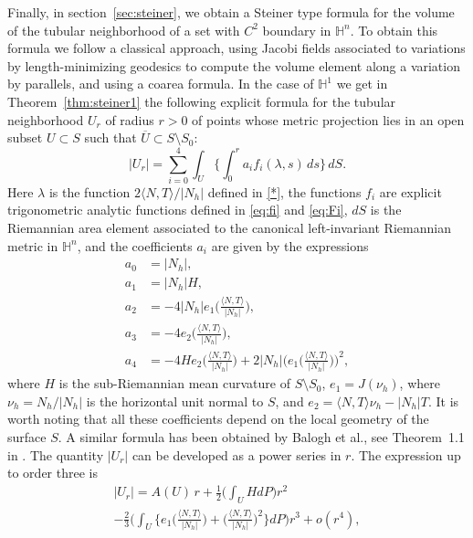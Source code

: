 \documentclass[10pt]{amsart}
\theoremstyle{definition}
\theoremstyle{remark}
\numberwithin{equation}{section}
\begin{document}
Finally, in section~\ref{sec:steiner}, we obtain a Steiner type formula for the volume of the tubular neighborhood of a set with $C^2$ boundary in ${{\mathbb{H}}}^n$. To obtain this formula we follow a classical approach, using Jacobi fields associated to variations by length-minimizing geodesics to compute the volume element along a variation by parallels, and using a coarea formula. In the case of ${{\mathbb{H}}}^1$ we get in  Theorem~\ref{thm:steiner1} the following explicit formula for the tubular neighborhood $U_r$ of radius $r>0$ of points whose metric projection lies in an open subset $U\subset S$ such that $\overline{U}\subset S\setminus S_0$:
\begin{equation*}
|U_r|= \sum_{i=0}^4\int_U\bigg\{\int_0^r a_i f_i({\lambda}, s)\,ds\bigg\}\,dS.
\end{equation*}
Here ${\lambda}$ is the function $2{\langle{N,T}\rangle}/|N_h|$ defined in \eqref{*}, the functions $f_i$ are explicit trigonometric analytic functions defined in \eqref{eq:fi} and \eqref{eq:Fi}, $dS$ is the Riemannian area element associated to the canonical left-invariant Riemannian metric in ${{\mathbb{H}}}^n$, and the coefficients $a_i$ are given by the expressions
\begin{equation*}
\begin{split}
a_{0}&=|N_{h}|,
\\
a_{1}&=|N_h| H,
\\
a_{2}&=-4|N_h|e_1\bigg({\frac{{\langle{N,T}\rangle}}{|N_h|}}\bigg),
\\
a_{3}&=-4e_2\bigg({\frac{{\langle{N,T}\rangle}}{|N_h|}}\bigg),
\\
a_{4}&=-4He_2\bigg({\frac{{\langle{N,T}\rangle}}{|N_h|}}\bigg)+2|N_h|\bigg(e_1\bigg({\frac{{\langle{N,T}\rangle}}{|N_h|}}\bigg)\bigg)^2,
\end{split}
\end{equation*}
where $H$ is the sub-Riemannian mean curvature of $S\setminus S_0$, $e_1=J({\nu_{h}})$, where ${\nu_{h}}=N_h/|N_h|$ is the horizontal unit normal to $S$, and $e_2={\langle{N,T}\rangle}{\nu_{h}}-{|N_{h}|} T$. It is worth noting that all these coefficients depend on the local geometry of the surface $S$. A similar formula has been obtained by Balogh et al., see Theorem~1.1 in \cite{MR3388879}. The quantity $|U_r|$ can be developed as a power series in $r$. The expression up to order three is
\begin{multline*}
|U_r|=A(U)\,r+\frac{1}{2}\bigg(\int_UHdP\bigg)r^2
\\
-\frac{2}{3}\bigg(\int_U\bigg\{e_1\bigg({\frac{{\langle{N,T}\rangle}}{|N_h|}}\bigg)+\bigg({\frac{{\langle{N,T}\rangle}}{|N_h|}}\bigg)^2\bigg\}dP\bigg)r^3+o(r^4),
\end{multline*}
\end{document}
